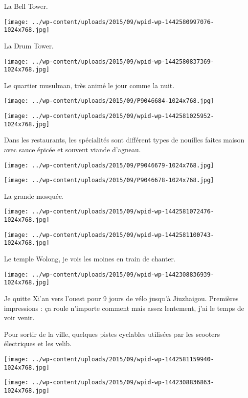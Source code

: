  La Bell Tower.
\begin{center} \texttt{[image: ../wp-content/uploads/2015/09/wpid-wp-1442580997076-1024x768.jpg]} \end{center}

 La Drum Tower. 
\begin{center} \texttt{[image: ../wp-content/uploads/2015/09/wpid-wp-1442580837369-1024x768.jpg]} \end{center}

 Le quartier musulman, très animé le jour comme la nuit.
\begin{center} \texttt{[image: ../wp-content/uploads/2015/09/P9046684-1024x768.jpg]} \end{center}
\begin{center} \texttt{[image: ../wp-content/uploads/2015/09/wpid-wp-1442581025952-1024x768.jpg]} \end{center}

 Dans les restaurants, les spécialités sont différent types de nouilles faites maison avec sauce épicée et souvent viande d'agneau. 
\begin{center} \texttt{[image: ../wp-content/uploads/2015/09/P9046679-1024x768.jpg]} \end{center}
\begin{center} \texttt{[image: ../wp-content/uploads/2015/09/P9046678-1024x768.jpg]} \end{center}

 La grande mosquée.
\begin{center} \texttt{[image: ../wp-content/uploads/2015/09/wpid-wp-1442581072476-1024x768.jpg]} \end{center}
\begin{center} \texttt{[image: ../wp-content/uploads/2015/09/wpid-wp-1442581100743-1024x768.jpg]} \end{center}
 
 Le temple Wolong, je vois les moines en train de chanter. 
\begin{center} \texttt{[image: ../wp-content/uploads/2015/09/wpid-wp-1442308836939-1024x768.jpg]} \end{center}

\pagebreak
 Je quitte Xi'an vers l'ouest pour 9 jours de vélo jusqu'à Jiuzhaigou. Premières impressions : ça roule n'importe comment mais assez lentement, j'ai le temps de voir venir.

 Pour sortir de la ville, quelques pistes cyclables utilisées par les scooters électriques et les velib.
\begin{center} \texttt{[image: ../wp-content/uploads/2015/09/wpid-wp-1442581159940-1024x768.jpg]} \end{center}
\begin{center} \texttt{[image: ../wp-content/uploads/2015/09/wpid-wp-1442308836863-1024x768.jpg]} \end{center}


